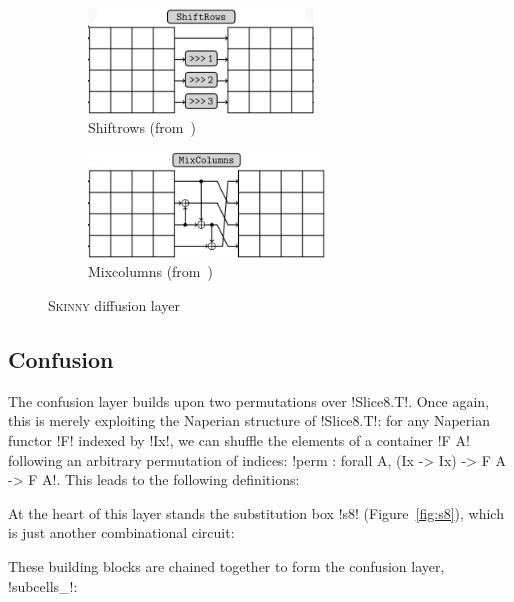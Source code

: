 \documentclass[draft,english]{jflart}
\newcommand{\Skinny}{\textsc{Skinny}}
\begin{document}
\begin{figure}[tp]
  \centering
  \begin{subfigure}[t]{0.45\textwidth}
    \centering
    \includegraphics[draft=false,height=2.8cm]{shiftrows}
    \caption{Shiftrows (from~\citet{beierle:skinny})}
    \label{fig:shiftrows}
  \end{subfigure}
  \begin{subfigure}[t]{0.45\textwidth}
    \centering
    \includegraphics[draft=false,height=2.8cm]{mixcolumns}
    \caption{Mixcolumns (from~\citet{beierle:skinny})}
    \label{fig:mixcolumns}
  \end{subfigure}
  \caption{\Skinny{} diffusion layer}
\end{figure}

\subsection{Confusion}


The confusion layer builds upon two permutations over \coqe!Slice8.T!.
Once again, this is merely exploiting the Naperian structure of
\coqe!Slice8.T!: for any Naperian functor \coqe!F! indexed by
\coqe!Ix!, we can shuffle the elements of a container \coqe!F A! following an arbitrary permutation of indices:
%
\coqe!perm : forall A, (Ix -> Ix) -> F A -> F A!.
%
This leads to the following definitions:
%


At the heart of this layer stands the substitution box \coqe!s8!
(Figure~\ref{fig:s8}), which is just another combinational circuit:
%

These building blocks are chained together to form the confusion
layer, \coqe!subcells_!:
%
\end{document}
